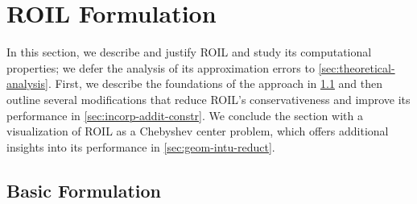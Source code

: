 

\section{ROIL Formulation}\label{sec:optimization-formulation}


In this section, we describe and justify ROIL and study its computational properties; we defer the analysis of its approximation errors to \cref{sec:theoretical-analysis}. First, we describe the foundations of the approach in \cref{sec:basic-formulation} and then outline several modifications that reduce ROIL's conservativeness and improve its performance in \cref{sec:incorp-addit-constr}. We conclude the section with a visualization of ROIL as a Chebyshev center problem, which offers additional insights into its performance in \cref{sec:geom-intu-reduct}.  


\subsection{Basic Formulation}
\label{sec:basic-formulation}

